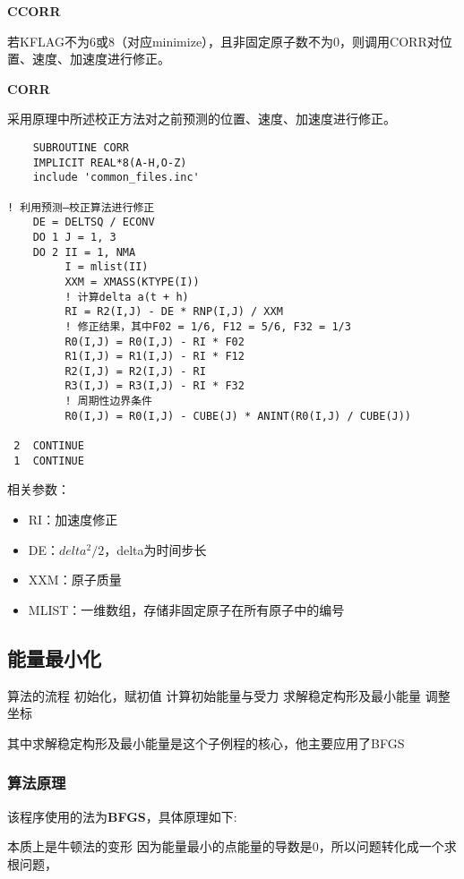 \documentclass[UTF-8]{ctexart}
\begin{document}
\noindent
\textbf{CCORR}

若KFLAG不为6或8（对应minimize），且非固定原子数不为0，则调用CORR对位置、速度、加速度进行修正。

\noindent
\textbf{CORR}

采用原理中所述校正方法对之前预测的位置、速度、加速度进行修正。

\begin{verbatim}
    SUBROUTINE CORR
    IMPLICIT REAL*8(A-H,O-Z)
    include 'common_files.inc'

! 利用预测—校正算法进行修正
    DE = DELTSQ / ECONV
    DO 1 J = 1, 3
    DO 2 II = 1, NMA
         I = mlist(II)
         XXM = XMASS(KTYPE(I))
         ! 计算delta a(t + h)
         RI = R2(I,J) - DE * RNP(I,J) / XXM
         ! 修正结果，其中F02 = 1/6, F12 = 5/6, F32 = 1/3
         R0(I,J) = R0(I,J) - RI * F02
         R1(I,J) = R1(I,J) - RI * F12
         R2(I,J) = R2(I,J) - RI
         R3(I,J) = R3(I,J) - RI * F32
         ! 周期性边界条件
         R0(I,J) = R0(I,J) - CUBE(J) * ANINT(R0(I,J) / CUBE(J))

 2  CONTINUE
 1  CONTINUE
\end{verbatim}

\noindent
相关参数：
\begin{itemize}
    \item RI：加速度修正
    \item DE：$delta ^ 2 / 2$，delta为时间步长
    \item XXM：原子质量
    \item MLIST：一维数组，存储非固定原子在所有原子中的编号
\end{itemize}


\subsection{能量最小化}

算法的流程
初始化，赋初值 
计算初始能量与受力 
求解稳定构形及最小能量 
调整坐标 

其中求解稳定构形及最小能量是这个子例程的核心，他主要应用了BFGS

\subsubsection{算法原理}

该程序使用的法为\textbf{BFGS}，具体原理如下:

本质上是牛顿法的变形
因为能量最小的点能量的导数是0，所以问题转化成一个求根问题，
\end{document}
